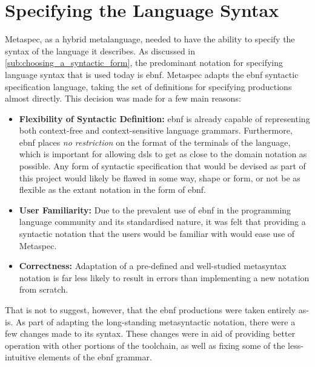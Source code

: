 

\section{Specifying the Language Syntax} %
\label{sec:specifying_the_language_syntax}
Metaspec, as a hybrid metalanguage, needed to have the ability to specify the syntax of the language it describes. 
As discussed in \autoref{sub:choosing_a_syntactic_form}, the predominant notation for specifying language syntax that is used today is \gls{ebnf}.
Metaspec adapts the \gls{ebnf} syntactic specification language, taking the set of definitions for specifying productions almost directly.
This decision was made for a few main reasons:
\begin{itemize}
    \item \textbf{Flexibility of Syntactic Definition:} \gls{ebnf} is already capable of representing both context-free and context-sensitive language grammars.
    Furthermore, \gls{ebnf} places \textit{no restriction} on the format of the terminals of the language, which is important for allowing \glspl{dsl} to get as close to the domain notation as possible. 
    Any form of syntactic specification that would be devised as part of this project would likely be flawed in some way, shape or form, or not be as flexible as the extant notation in the form of \gls{ebnf}. 
    \item \textbf{User Familiarity:} Due to the prevalent use of \gls{ebnf} in the programming language community and its standardised nature, it was felt that providing a syntactic notation that the users would be familiar with would ease use of Metaspec. 
    \item \textbf{Correctness:} Adaptation of a pre-defined and well-studied metasyntax notation is far less likely to result in errors than implementing a new notation from scratch.
\end{itemize}

That is not to suggest, however, that the \gls{ebnf} productions were taken entirely as-is. 
As part of adapting the long-standing metasyntactic notation, there were a few changes made to its syntax.
These changes were in aid of providing better operation with other portions of the toolchain, as well as fixing some of the less-intuitive elements of the \gls{ebnf} grammar. 

